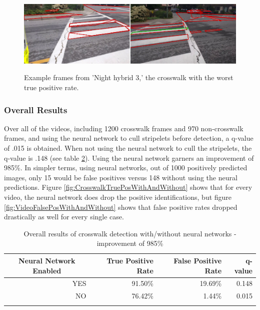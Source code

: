 \documentclass[12pt]{ucthesis}
\newcommand{\captionfonts}{\small\bf\ssp}
\begin{document}
\begin{figure}[t]
\begin{center}
\includegraphics[width=14cm]{WorstCwalk.png}
\captionfonts
\caption[Examples of worst crosswalk]{Example frames from 'Night hybrid 3,' the crosswalk with the worst true positive rate.}
\label{fig:worstcwalk}
\end{center}
\end{figure}

\subsubsection{Overall Results}
Over all of the videos, including 1200 crosswalk frames and 970 non-crosswalk frames, and using the neural network to cull stripelets before detection, a q-value of .015 is obtained. When not using the neural network to cull the stripelets, the q-value is .148 (see table \ref{tab:overallresults}). Using the neural network garners an improvement of 985\%. In simpler terms, using neural networks, out of 1000 positively predicted images, only 15 would be false positives versus 148 without using the neural predictions. Figure \ref{fig:CrosswalkTruePosWithAndWithout} shows that for every video, the neural network does drop the positive identifications, but figure \ref{fig:VideoFalsePosWithAndWithout} shows that false positive rates dropped drastically as well for every single case. 


\begin{table}[t]
    \begin{longtable}[t]{|r|r|r|r|}
    \hline
    \multicolumn{1}{|c|}{Neural Network Enabled} & True Positive Rate & False Positive Rate & q-value \bigstrut\\
    \hline
    YES & 91.50\% & 19.69\% & 0.148 \bigstrut\\
    \hline
    NO & 76.42\% & 1.44\% & 0.015 \bigstrut\\
    \hline

    \caption[Overall Results of Crosswalk Detection With and Without Neural Networks]{Overall results of crosswalk detection with/without neural networks -  improvement of 985\%}
    \label{tab:overallresults} 
    \end{longtable}
\end{table}
\end{document}
